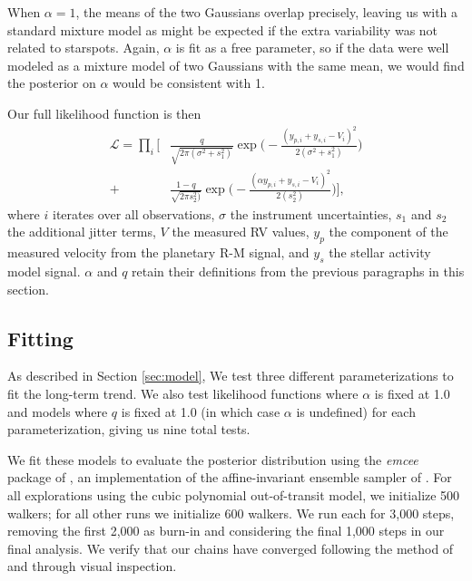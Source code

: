 \documentclass[twocolumn]{aastex63}
\begin{document}
When $\alpha = 1$, the means of the two Gaussians overlap precisely, leaving us with a standard mixture model as might be expected if the extra variability was not related to starspots. Again, $\alpha$ is fit as a free parameter, so if the data were well modeled as a mixture model of two Gaussians with the same mean, we would find the posterior on $\alpha$ would be consistent with 1.


Our full likelihood function is then
\begin{equation}
\begin{split}
\mathcal{L} = \prod_i \bigg[ & \frac{q}{\sqrt{2\pi (\sigma^2 + s_1^2)}} \exp\bigg(-\frac{(y_{p,i} + y_{s,i}-V_i)^2}{2(\sigma^2 + s_1^2)}\bigg)  \\+ & \frac{1-q}{\sqrt{2\pi s_2^2)}} \exp\bigg(-\frac{(\alpha y_{p,i} + y_{s,i}-V_i)^2}{2(s_2^2)}\bigg) \bigg],
\end{split}
\end{equation}
where $i$ iterates over all observations, $\sigma$ the instrument uncertainties, $s_1$ and $s_2$ the additional jitter terms, $V$ the measured RV values, $y_p$ the component of the measured velocity from the planetary R-M signal, and $y_s$ the stellar activity model signal. $\alpha$ and $q$ retain their definitions from the previous paragraphs in this section.

\subsection{Fitting}

As described in Section \ref{sec:model}, We test three different parameterizations to fit the long-term trend. 
We also test likelihood functions where $\alpha$ is fixed at 1.0 and models where $q$ is fixed at 1.0 (in which case $\alpha$ is undefined) for each parameterization, giving us nine total tests.

We fit these models to evaluate the posterior distribution using the \textit{emcee} package of \citet{Foreman-Mackey12}, an implementation of the affine-invariant ensemble sampler of \citet{Goodman10}.
For all explorations using the cubic polynomial out-of-transit model, we initialize 500 walkers; for all other runs we initialize 600 walkers. 
We run each for 3,000 steps, removing the first 2,000 as burn-in and considering the final 1,000 steps in our final analysis. 
We verify that our chains have converged following the method of \citet{Geweke92} and through visual inspection.
\end{document}
